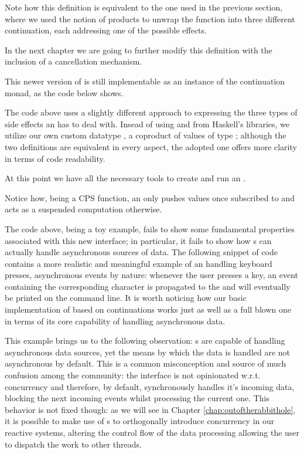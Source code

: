 Note how this definition is equivalent to the one used in the previous section, where we used the notion of products to unwrap the  function into three different continuation, each addressing one of the possible effects. 

In the next chapter we are going to further modify this definition with the inclusion of a cancellation mechanism.

This newer version of  is still implementable as an instance of the continuation monad, as the code below shows.


The code above uses a slightly different approach to expressing the three types of side effects an  has to deal with. Insead of using  and  from Haskell's libraries, we utilize our own custom datatype , a coproduct of values of type ; although the two definitions are equivalent in every aspect, the adopted one offers more clarity in terms of code readability.

At this point we have all the necessary tools to create and run an .


Notice how, being a CPS function, an  only pushes values once subscribed to and acts as a suspended computation otherwise. 

The code above, being a toy example, fails to show some fundamental properties associated with this new interface; in particular, it fails to show how s can actually handle asynchronous sources of data. The following snippet of code contains a more realistic and meaningful example of an  handling keyboard presses, asynchronous events by nature: whenever the user presses a key, an event containing the corresponding character is propagated to the  and will eventually be printed on the command line. It is worth noticing how our basic implementation of  based on continuations works just as well as a full blown one in terms of its core capability of handling asynchronous data.


This example brings us to the following observation: s are capable of handling asynchronous data sources, yet the means by which the data is handled are not asynchronous by default. This is a common misconception and source of much confusion among the community: the  interface is not opinionated w.r.t. concurrency and therefore, by default, synchronously handles it's incoming data, blocking the next incoming events whilst processing the current one. This behavior is not fixed though: as we will see in Chapter \ref{chap:outoftherabbithole}, it is possible to make use of s to orthogonally introduce concurrency in our reactive systems, altering the control flow of the data processing allowing the user to dispatch the work to other threads.

